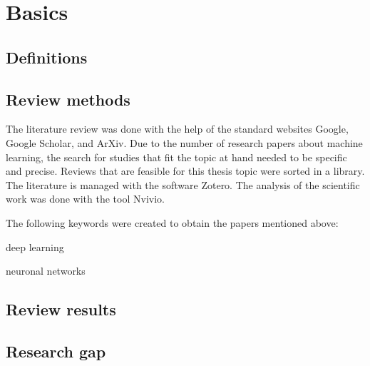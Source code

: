 \newpage
\section{Basics}\label{research}

\subsection{Definitions}


\subsection{Review methods}
The literature review was done with the help of the standard websites Google, Google Scholar, and ArXiv. Due to the number of research papers about machine learning, the search for studies that fit the topic at hand needed to be specific and precise. Reviews that are feasible for this thesis topic were sorted in a library. The literature is managed with the software Zotero. The analysis of the scientific work was done with the tool Nvivio.

The following keywords were created to obtain the papers mentioned above:

\begin{compactenum}
	\item \glqq deep learning\grqq
	\item \glqq neuronal networks\grqq
\end{compactenum}

\subsection{Review results}\label{reviewresult}

\subsection{Research gap} 